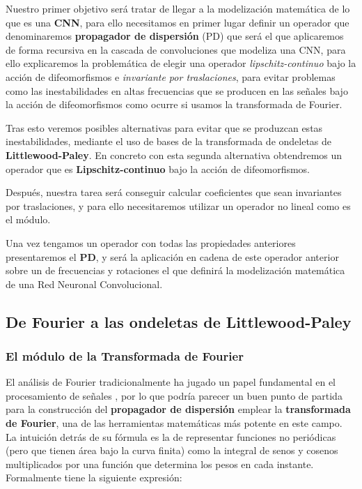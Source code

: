 \noindent Nuestro primer objetivo será tratar de llegar a la modelización matemática de lo que es una \textbf{CNN}, para ello necesitamos en primer lugar definir un operador que denominaremos \textbf{propagador de dispersión} (PD) que será el que aplicaremos de forma recursiva en la cascada de convoluciones que modeliza una CNN, para ello explicaremos la problemática de elegir una operador \textit{lipschitz-continuo} bajo la acción de difeomorfismos e \textit{invariante por traslaciones}, para evitar problemas como las inestabilidades en altas frecuencias que se producen en las señales bajo la acción de difeomorfismos como ocurre si usamos la transformada de Fourier. 

\medskip

\noindent Tras esto  veremos posibles alternativas para evitar que se produzcan estas inestabilidades, mediante el uso de bases de la transformada de ondeletas de \textbf{Littlewood-Paley}. En concreto con esta segunda alternativa obtendremos un operador que es \textbf{Lipschitz-continuo} bajo la acción de difeomorfismos. 

\medskip

\noindent Después, nuestra tarea será conseguir calcular coeficientes que sean invariantes por traslaciones, y para ello necesitaremos utilizar un operador no lineal como es el módulo. 

\medskip

\noindent Una vez tengamos un operador con todas las propiedades anteriores presentaremos el \textbf{PD}, y será la aplicación en cadena de este operador anterior sobre un  de frecuencias y rotaciones el que definirá la modelización matemática de una Red Neuronal Convolucional.


\subsection{De Fourier a las ondeletas de Littlewood-Paley}

\subsubsection{El módulo de la Transformada de Fourier}

\noindent El análisis de Fourier tradicionalmente ha jugado un papel fundamental en el procesamiento de señales \cite{DigitalImageProcessing}, por lo que podría parecer un buen punto de partida para la construcción del \textbf{propagador de dispersión} emplear la \textbf{transformada de Fourier}, una de las herramientas matemáticas más potente en este campo. La intuición detrás de su fórmula es la de representar funciones no periódicas (pero que tienen área bajo la curva finita) como la integral de senos y cosenos multiplicados por una función que determina los pesos en cada instante. Formalmente tiene la siguiente expresión:

